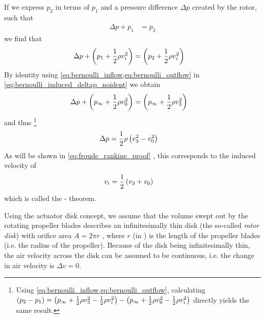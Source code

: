 If we express $p_2$ in terms of $p_1$ and a pressure difference $\Delta p$ created by the rotor, such that
\begin{align}
\Delta p + p_1 &= p_2
\end{align}
%
we find that
%
\begin{align}
\Delta p + \left( p_1 + \frac{1}{2} \rho v^2_i \right) &= \left(  p_2 + \frac{1}{2} \rho v^2_i \right) \label{eq:bernoulli_induced_deltap_noident}
\end{align}
%
By identity using \cref{eq:bernoulli_inflow,eq:bernoulli_outflow} in \cref{eq:bernoulli_induced_deltap_noident} we obtain
%
\begin{align}
\Delta p + \left( p_\infty + \frac{1}{2} \rho v^2_0 \right) &= \left( p_\infty + \frac{1}{2} \rho v^2_3 \right) \label{eq:bernoulli_induced_deltap}
\end{align}
%
and thus%
\footnote{Using \cref{eq:bernoulli_inflow,eq:bernoulli_outflow}, calculating
$\left( p_2 - p_1 \right) = \left(p_\infty + \frac{1}{2} \rho v^2_3 - \frac{1}{2} \rho v^2_i\right) - \left( p_\infty + \frac{1}{2} \rho v^2_0 - \frac{1}{2} \rho v^2_i\right)$ directly yields the same result.
}
%
\begin{align}
\Delta p &= \frac{1}{2} \rho \left( v^2_3 - v^2_0 \right) \label{eq:pressure_difference_v3}
\end{align}
%
As will be shown in \cref{eq:froude_rankine_proof} , this corresponds to the induced velocity of
%
\begin{align}
v_i &= \frac{1}{2} \left( v_3 + v_0 \right) \label{eq:froude_rankine_theorem}
\end{align}
%
which is called the - theorem.

Using the actuator disk concept, we assume that the volume swept out by the rotating propeller blades describes an infinitesimally thin disk (the so-called \textit{rotor disk}) with orifice area $A = 2\pi r$%
, where $r$ (in \withunit{\metre}) is the length of the propeller blades (i.e. the radius of the propeller).
Because of the disk being infinitesimally thin, the air velocity across the disk can be assumed to be continuous, i.e. the change in air velocity is $\Delta v = 0$. 

